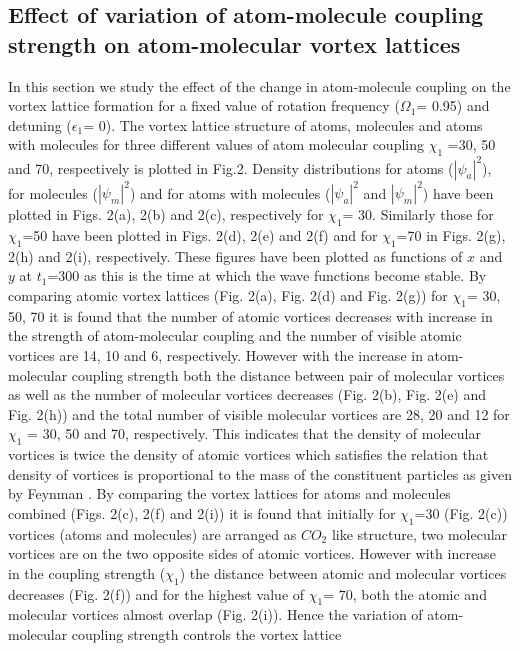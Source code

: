 \documentclass[10pt,a4paper]{article}
\begin{document}
\subsection{Effect of variation of atom-molecule coupling strength on atom-molecular vortex lattices}
 In this section we study the effect of the change in atom-molecule
coupling on the vortex lattice formation for a fixed value of
rotation frequency ($\Omega_1$= 0.95) and detuning ($\epsilon_1$=
0). The vortex lattice structure of atoms, molecules and
atoms with molecules for three different values of atom molecular
coupling $\chi_1$ =30, 50 and 70, respectively is plotted in Fig.2.
Density distributions for atoms ($|\psi_a|^2$), for molecules
($|\psi_m|^2$) and for atoms with molecules
($|\psi_a|^2$ and $|\psi_m|^2$) have been plotted in Figs.
2(a), 2(b) and 2(c), respectively for $\chi_1$= 30. Similarly those for
$\chi_1$=50 have been plotted in Figs. 2(d), 2(e) and 2(f) and for
$\chi_1$=70 in Figs. 2(g), 2(h) and 2(i), respectively. These figures
have been plotted as functions of $x$ and $y$ at $t_1$=300 as this
is the time at which the wave functions become stable. By comparing atomic vortex lattices (Fig. 2(a), Fig. 2(d)
and Fig. 2(g)) for $\chi_1$= 30, 50, 70 it is found that the number of
atomic vortices decreases with increase in the strength of
atom-molecular coupling and the number of visible atomic vortices
are 14, 10 and 6, respectively. However with the increase in
atom-molecular coupling strength both the distance between pair of
molecular vortices as well as the number of molecular vortices
decreases (Fig. 2(b), Fig. 2(e) and Fig. 2(h)) and the total number
of visible molecular vortices are 28, 20 and 12 for $\chi_1$ = 30,
50 and 70, respectively. This indicates that the density of molecular vortices is
twice the density of atomic vortices which satisfies the relation
that density of vortices is proportional to the mass of the
constituent particles as given by Feynman \cite{Feynman}. By comparing the vortex 
lattices for atoms and molecules combined (Figs. 2(c), 2(f) and 2(i)) it is found that 
initially for $\chi_1$=30 (Fig. 2(c)) vortices (atoms and molecules) are arranged as $CO_2$ 
like structure, two molecular vortices are on the two opposite sides of atomic vortices. 
However with increase in  the coupling strength ($\chi_1$) the distance between atomic and 
molecular vortices decreases  (Fig. 2(f)) and for the highest value of $\chi_1$= 70, both 
the atomic and molecular vortices almost overlap  (Fig. 2(i)). Hence the variation
of atom-molecular coupling strength controls the vortex lattice
\end{document}
